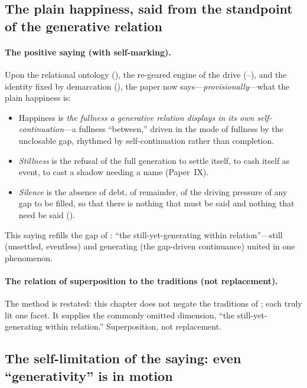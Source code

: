 \subsection{The plain happiness, said from the standpoint of the generative relation}
\label{p19:sub:gen-saying}

\paragraph{The positive saying (with self-marking).} Upon the relational ontology (), the re-geared engine of the drive (--), and the identity fixed by demarcation (), the paper now says---\emph{provisionally}---what the plain happiness is:
\begin{itemize}
  \item Happiness is \emph{the fullness a generative relation displays in its own self-continuation}---a fullness ``between,'' driven in the mode of fullness by the unclosable gap, rhythmed by self-continuation rather than completion.
  \item \emph{Stillness} is the refusal of the full generation to settle itself, to cash itself as event, to cast a shadow needing a name (Paper~IX).
  \item \emph{Silence} is the absence of debt, of remainder, of the driving pressure of any gap to be filled, so that there is nothing that must be said and nothing that need be said ().
\end{itemize}
This saying refills the gap of : ``the still-yet-generating within relation''---still (unsettled, eventless) and generating (the gap-driven continuance) united in one phenomenon.

\paragraph{The relation of superposition to the traditions (not replacement).} The method is restated: this chapter does not negate the traditions of ; each truly lit one facet. It supplies the commonly omitted dimension, ``the still-yet-generating within relation.'' Superposition, not replacement.

\subsection{The self-limitation of the saying: even ``generativity'' is in motion}
\label{p19:sub:gen-selflimit}

